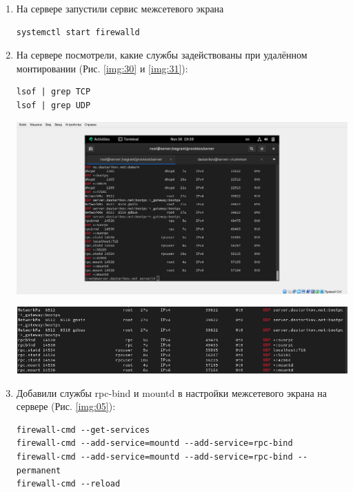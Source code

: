 \begin{enumerate}
\item На сервере запустили сервис межсетевого экрана
    \begin{verbatim}
systemctl start firewalld
    \end{verbatim}
\item На сервере посмотрели, какие службы задействованы при удалённом монтировании (Рис. \ref{img:30} и \ref{img:31}):
    \begin{verbatim}
lsof | grep TCP
lsof | grep UDP
    \end{verbatim}

\begin{center}
    \centering
    \includegraphics[width=\textwidth]{../images/image30.png}
    \label{img:30}
\end{center}
\begin{center}
    \centering
    \includegraphics[width=\textwidth]{../images/image31.png}
    \label{img:31}
\end{center}
\item Добавили службы rpc-bind и mountd в настройки межсетевого экрана на сервере (Рис. \ref{img:05}):
    \begin{verbatim}
firewall-cmd --get-services
firewall-cmd --add-service=mountd --add-service=rpc-bind
firewall-cmd --add-service=mountd --add-service=rpc-bind --permanent
firewall-cmd --reload
    \end{verbatim}


\end{enumerate}
